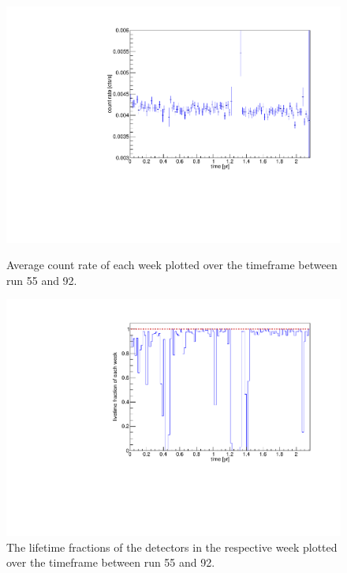 \documentclass[encoding=utf8,british]{tumphthesis}
\begin{document}
\begin{figure}[t!]
	\centering
   	\begin{minipage}[t]{.475\textwidth}
		\centering
		\includegraphics[width=\textwidth]{./Bilder/eventRate.pdf}
		\caption{Average count rate of each week plotted over the timeframe between run 55 and 92. }
		\label{fig:ChangeInEventRate}
	\end{minipage}\hfill%
	\begin{minipage}[t]{.475\textwidth}
		\centering
		\includegraphics[width=\textwidth]{./Bilder/onceInALivetime.pdf}
		\caption{The lifetime fractions of the detectors in the respective week plotted over the timeframe between run 55 and 92.}
		\label{fig:lifetime}
	\end{minipage}
\vspace{5mm}
\end{figure}
\end{document}
